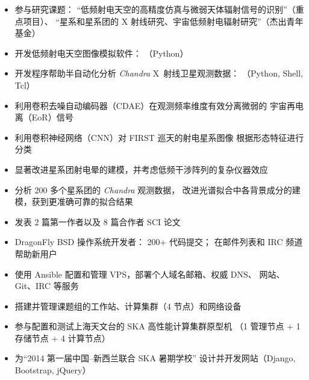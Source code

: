 \documentclass[zh]{resume}
\begin{document}
\begin{itemize}
  \item 参与研究课题：
    \enquote{低频射电天空的高精度仿真与微弱天体辐射信号的识别}（重点项目）、
    \enquote{星系和星系团的 X 射线研究、宇宙低频射电辐射研究}（杰出青年基金）
  \item 开发低频射电天空图像模拟软件：
    （Python）
  \item 开发程序帮助半自动化分析 \textit{Chandra} X~射线卫星观测数据：
    （Python, Shell, Tcl）
  \item 利用卷积去噪自动编码器（CDAE）在观测频率维度有效分离微弱的
    宇宙再电离（EoR）信号
  \item 利用卷积神经网络（CNN）对 FIRST 巡天的射电星系图像
    根据形态特征进行分类
  \item 显著改进星系团射电晕的建模，并考虑低频干涉阵列的复杂仪器效应
  \item 分析 200 多个星系团的 \textit{Chandra} 观测数据，
    改进光谱拟合中各背景成分的建模，获到更准确可靠的拟合结果
  \item 发表 2 篇第一作者以及 8 篇合作者 SCI 论文
\end{itemize}

\begin{itemize}
  \item DragonFly BSD 操作系统开发者：
    200+ 代码提交；
    在邮件列表和 IRC 频道帮助新用户
  \item 使用 Ansible 配置和管理 VPS，部署个人域名邮箱、权威 DNS、
    网站、Git、IRC 等服务
  \item 搭建并管理课题组的工作站、计算集群（4 节点）和网络设备
  \item 参与配置和测试上海天文台的 SKA 高性能计算集群原型机
    （1 管理节点 + 1 存储节点 + 4 计算节点）
  \item 为\enquote{2014 第一届中国--新西兰联合 SKA 暑期学校}
    设计并开发网站（Django, Bootstrap, jQuery）
\end{itemize}
\end{document}
